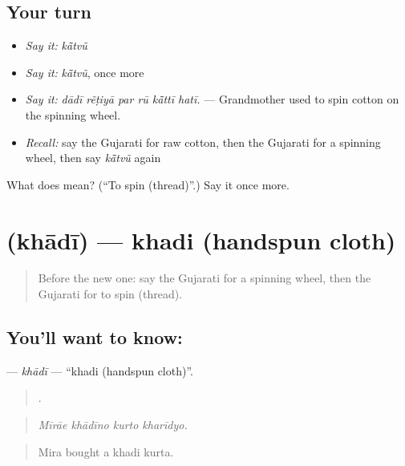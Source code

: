 \subsection*{Your turn}
\begin{itemize}
\raggedright
  \item \emph{Say it:} \emph{kā̃tvũ}
  \item \emph{Say it:} \emph{kā̃tvũ}, once more
  \item \emph{Say it:} \emph{dādī rẽṭiyā par rū kā̃ttī hatī.} — Grandmother used to spin cotton on the spinning wheel.
  \item \emph{Recall:} say the Gujarati for raw cotton, then the Gujarati for a spinning wheel, then say \emph{kā̃tvũ} again
\end{itemize}

\begin{tcolorbox}[breakable,colback=teal!4,colframe=teal!35!black,title={Before you move on}]
What does  mean? (\textquotedblleft{}To spin (thread)\textquotedblright{}.) Say it once more.
\end{tcolorbox}
\section[\texorpdfstring{\gu{ખાદી} (khādī)}{ખાદી (khādī)}]{ (khādī) — khadi (handspun cloth)}

\label{lesson:GU-C505-khadi}



\begin{quote}
Before the new one: say the Gujarati for a spinning wheel, then the Gujarati for to spin (thread).
\end{quote}

\subsection*{You'll want to know: }
\textbf{} — \emph{khādī} — \textquotedblleft{}khadi (handspun cloth)\textquotedblright{}.

\begin{quote}
   .
\end{quote}

\begin{quote}
\emph{Mīrāe khādīno kurto kharīdyo.}
\end{quote}

\begin{quote}
Mira bought a khadi kurta.
\end{quote}


